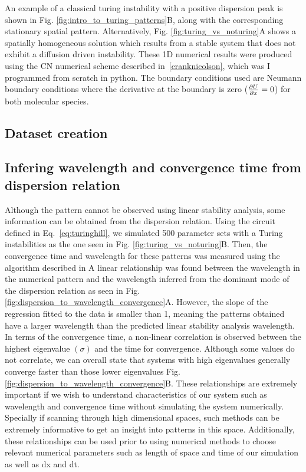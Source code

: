 An example of a classical turing instability with a positive dispersion peak is shown in Fig. \ref{fig:intro_to_turing_patterns}B, along with the corresponding stationary spatial pattern.
Alternatively,  Fig. \ref{fig:turing_vs_noturing}A shows a spatially homogeneous solution which results from a stable system that does not exhibit a diffusion driven instability.
These 1D numerical results were produced using the \acrfull{CN} numerical scheme described in~\ref{cranknicolson}, which was I programmed from scratch in python. The boundary conditions used are Neumann boundary conditions where the derivative at the boundary is zero ($\pdv{U}{x}=0$) for both molecular species.

\subsection{Dataset creation}


\subsection{Infering wavelength and convergence time from dispersion relation}

Although the pattern cannot be observed using linear stability analysis, some information can be obtained from the dispersion relation.
Using the circuit defined in Eq.~\eqref{eq:turinghill}, we simulated 500 parameter sets with a Turing instabilities as the one seen in Fig. \ref{fig:turing_vs_noturing}B. Then, the convergence time and wavelength for these patterns was measured using the algorithm described in %
A linear relationship was found between the wavelength in the numerical pattern and the wavelength inferred from the dominant mode of the dispersion relation as seen in Fig. \ref{fig:dispersion_to_wavelength_convergence}A. However, the slope of the regression fitted to the data is smaller than 1, meaning the patterns obtained have a larger wavelength than the predicted linear stability analysis wavelength.
In terms of the convergence time, a non-linear correlation is observed between the highest eigenvalue $(\sigma)$ and the time for convergence.
Although some values do not correlate, we can overall state that systems with high eigenvalues generally converge faster than those lower eigenvalues Fig. \ref{fig:dispersion_to_wavelength_convergence}B.
These relationships are extremely important if we wish to understand characteristics of our system such as wavelength and convergence time without simulating the system numerically.
Specially if scanning through high dimensional spaces, such methods can be extremely informative to get an insight into patterns in this space.
Additionally, these relationships can be used prior to using numerical methods to choose relevant numerical parameters such as length of space and time of our simulation as well as dx and dt.



